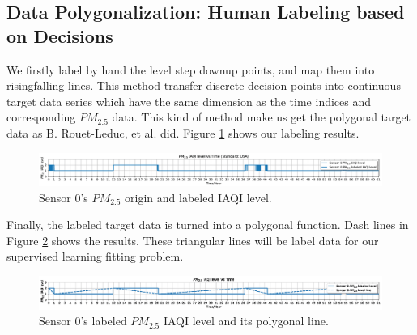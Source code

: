 \documentclass[sigconf]{acmart}
\begin{document}
\subsection{Data Polygonalization: Human Labeling based on Decisions}

We firstly label by hand the level step down\/up points, and map them into rising\/falling lines. This method transfer discrete decision points into continuous target data series which have the same dimension as the time indices and corresponding $PM_{2.5}$ data. This kind of method make us get the polygonal target data as B. Rouet-Leduc, et al. \cite{rouet2017machine} did. Figure \ref{fig:pm25_0_origin_and_labeled_level} shows our labeling results.

\begin{figure}[!htbp]
    \begin{center}
        \includegraphics[width=0.8\linewidth]{fig/data/labeled_iaqi_level/origin_and_labeled/pm25_0.png}
        \caption{Sensor 0's $PM_{2.5}$ origin and labeled IAQI level.}
        \label{fig:pm25_0_origin_and_labeled_level}
    \end{center}
\end{figure}


Finally, the labeled target data is turned into a polygonal function. Dash lines in Figure \ref{fig:pm25_0_labeled_level} shows the results. These triangular lines will be label data for our supervised learning fitting problem.

\begin{figure}[!htbp]
    \centering
    \includegraphics[width=0.8\linewidth]{fig/data/labeled_iaqi_level/pm25_0_labeled_iaqi_level.png}
    \caption{Sensor 0's labeled $PM_{2.5}$ IAQI level and its polygonal line.}
    \label{fig:pm25_0_labeled_level}
\end{figure}
\end{document}

